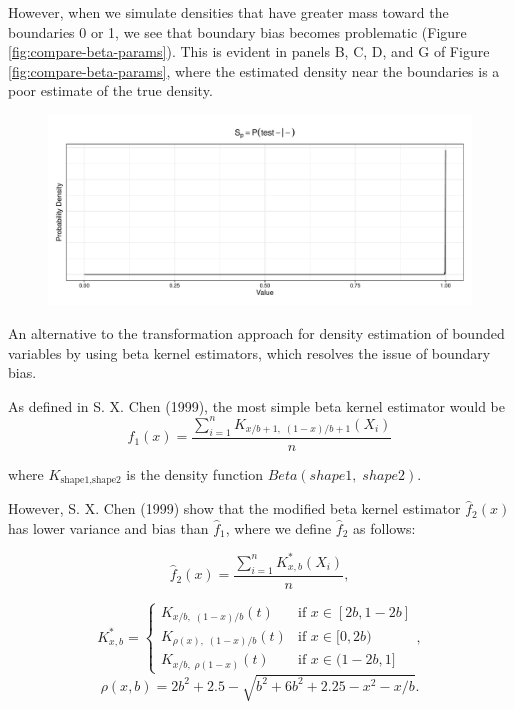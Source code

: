 \documentclass[12pt,twoside]{smiththesis}
\begin{document}
However, when we simulate densities that have greater mass toward the boundaries 0 or 1, we see that boundary bias becomes problematic (Figure \ref{fig:compare-beta-params}). This is evident in panels B, C, D, and G of Figure \ref{fig:compare-beta-params}, where the estimated density near the boundaries is a poor estimate of the true density.
\begin{figure}

{\centering \includegraphics[width=1\linewidth]{thesis_files/figure-latex/unnamed-chunk-40-1} 

}

\caption{\label{fig:compare-beta-params}}\label{fig:unnamed-chunk-40}
\end{figure}
An alternative to the transformation approach for density estimation of bounded variables by using beta kernel estimators, which resolves the issue of boundary bias.

As defined in S. X. Chen (1999), the most simple beta kernel estimator would be
\[\hat f_1(x) = \dfrac{\sum_{i=1}^n K_{x/b + 1, \; (1-x)/b + 1} (X_i)}{n}\]

where \(K_{\text{shape1}, \text{shape2}}\) is the density function \(Beta(shape1, \; shape2)\).

However, S. X. Chen (1999) show that the modified beta kernel estimator \(\hat f_2(x)\) has lower variance and bias than \(\hat f_1\), where we define \(\hat f_2\) as follows:

\[
\hat f_2(x)  = \dfrac{\sum_{i=1}^n K_{x,b}^*(X_i)}{n},\]

\[K^*_{x,b} = \begin{cases}K_{x/b, \; (1-x)/b }(t)  & \text{if }x \in [2b,1-2b] \\
K_{\rho(x), \; (1-x)/b } (t)  & \text{if } x \in [0,2b) \\
K_{x/b, \; \rho(1-x)}(t) & \text{if } x\in(1-2b,1]
\end{cases},
\]
\[\rho(x,b) = 2b^2 + 2.5 - \sqrt{b^2 + 6b^2 +2.25-x^2 -x/b}.\]
\end{document}
